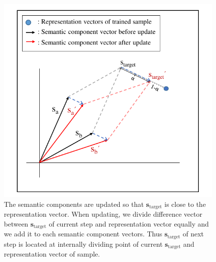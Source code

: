 \begin{figure}[!htb] %
  \includegraphics[width=\columnwidth]{../../figures/update.pdf}
  \caption{The semantic components are updated so that $ \mathbf{s}_{\text{target}} $ is close to the representation vector. When updating, we divide difference vector between $\mathbf{s}_{\text{target}}$ of current step and representation vector equally and we add it to each semantic component vectors. Thus $\mathbf{s}_{\text{target}}$ of next step is located at internally dividing point of current $\mathbf{s}_{\text{target}}$ and representation vector of sample. 
}
  \label{fig:update}
\end{figure}


